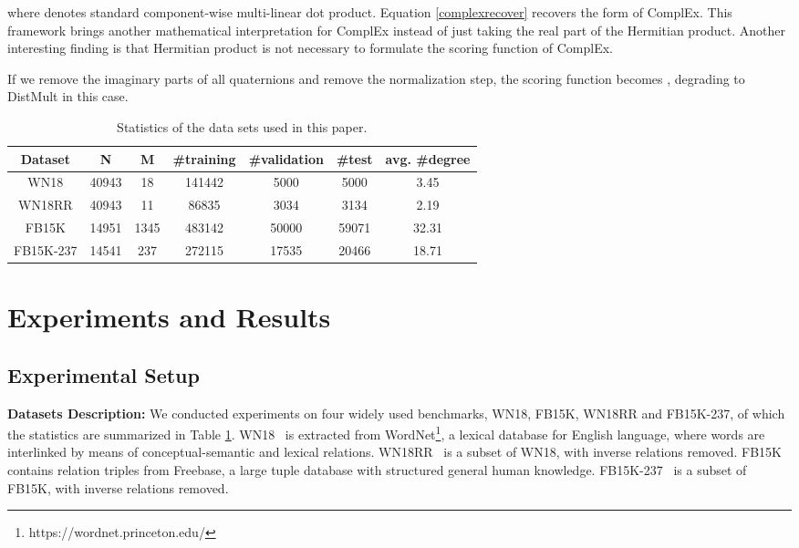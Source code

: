 \documentclass{article}
\begin{document}
where  denotes standard component-wise multi-linear dot product. Equation \ref{complexrecover} recovers the form of ComplEx. This framework brings another mathematical interpretation for ComplEx instead of just taking the real part of the Hermitian product. Another interesting finding is that Hermitian product is not necessary to formulate the scoring function of ComplEx.






If we remove the imaginary parts of all quaternions and remove the normalization step, the scoring function becomes , degrading to DistMult in this case.

\begin{table}[t]
\centering
\caption{Statistics of the data sets used in this paper.}
\label{datasets}
\small
\begin{tabular}{ccccccc}
\toprule
Dataset   & N & M & \#training & \#validation & \#test  & avg. \#degree\\
\midrule
WN18     &  40943  & 18  &      141442      &     5000         & 5000    &  3.45  \\
WN18RR    &   40943 & 11  &       86835     &     3034         &    3134  & 2.19  \\
FB15K     & 14951  &   1345&          483142  &       50000       &     59071  &32.31 \\
FB15K-237 &  14541 & 237  &    272115        &   17535           &      20466 & 18.71\\ \bottomrule
\end{tabular}
\vspace{-1.em}
\end{table}
\section{Experiments and Results}
\subsection{Experimental Setup}
\textbf{Datasets Description:} We conducted experiments on four widely used benchmarks, WN18, FB15K, WN18RR and FB15K-237, of which the statistics are summarized in Table \ref{datasets}.  WN18~\citep{bordes2013translating} is extracted from WordNet\footnote{https://wordnet.princeton.edu/}, a lexical database for English language, where words are interlinked by means of conceptual-semantic and lexical relations. WN18RR~\citep{dettmers2018convolutional} is a subset of WN18, with inverse relations removed. FB15K~\citep{bordes2013translating} contains relation triples from Freebase, a large tuple database with structured general human knowledge. FB15K-237~\citep{toutanova2015observed} is a subset of FB15K, with inverse relations removed.
\end{document}
